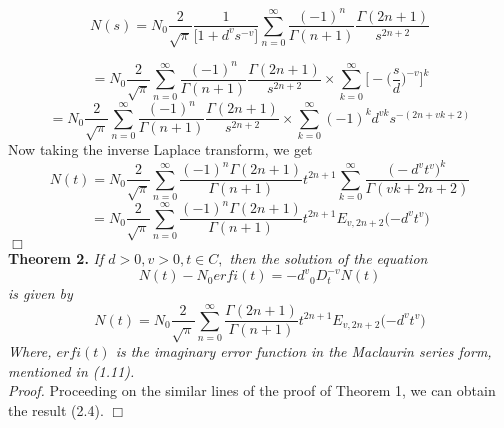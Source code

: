 \documentclass[leqno]{article}
\begin{document}
\begin{equation*}
    N(s) = N_0
    \frac{2}{\sqrt{\pi}}
    \frac{1}{\big[1+{d^v}{s^{-v}}\big]}
    \sum_{n = 0}^{\infty}
    \frac{(-1)^n}{\Gamma{(n+1)}}
    \frac{\Gamma{(2n+1)}}{s^{2n+2}}
\end{equation*}

\begin{equation*}
    =N_0
    \frac{2}{\sqrt{\pi}}\sum_{n = 0}^{\infty}
    \frac{(-1)^n}{\Gamma{(n+1)}}
    \frac{\Gamma{(2n+1)}}{s^{2n+2}}
    \times \sum_{k = 0}^{\infty}
    \Big[-\Big(\frac{s}{d}\Big)^{-v}\Big]^k
\end{equation*}
\begin{equation*}
    =N_0
    \frac{2}{\sqrt{\pi}}\sum_{n = 0}^{\infty}
    \frac{(-1)^n}{\Gamma{(n+1)}}
    \frac{\Gamma{(2n+1)}}{s^{2n+2}}
    \times \sum_{k = 0}^{\infty}
    (-1)^k d^{vk} s^{-(2n+vk+2)}
\end{equation*}
Now taking the inverse Laplace transform, we get
\begin{equation*}
    N(t)=N_0
    \frac{2}{\sqrt{\pi}}\sum_{n = 0}^{\infty}
    \frac{(-1)^n\Gamma{(2n+1)}}{\Gamma{(n+1)}}
    t^{2n+1}
    \sum_{k = 0}^{\infty}
    \frac{\Big(-d^v{t^v}\Big)^k}{\Gamma{(vk+2n+2)}}
\end{equation*}
\begin{equation*}
    =N_0
    \frac{2}{\sqrt{\pi}}
    \sum_{n = 0}^{\infty} 
    \frac{(-1)^n\Gamma{(2n+1)}}{\Gamma{(n+1)}}
    t^{2n+1}
    E_{v,{2n+2}}
    \Big({-d^v}{t^v}\Big)
\end{equation*}
\hfill$\Box$
\medskip
\noindent\\
{\bf Theorem 2.}
{\it 
If $d > 0, v > 0, t \in C,$ then the solution of the equation
\begin{equation}
    N(t) - N_0erfi(t) = {-d^v}{_0D_t^{-v}}N(t)
\end{equation}
is given by 
\begin{equation}
    N(t) = N_0
    \frac{2}{\sqrt{\pi}}
    \sum_{n = 0}^{\infty}
    \frac{\Gamma{(2n+1)}}{\Gamma{(n+1)}}
    t^{2n+1}
    E_{v,2n+2}
    \Big({-d^v}{t^v}\Big)
\end{equation}
Where, $erfi(t)$ is the imaginary error function in the Maclaurin series form, mentioned in (1.11). 
}
\vspace{0.05in}\\

\noindent
{\it Proof.} Proceeding on the similar lines of the proof of Theorem 1, we can obtain the result (2.4).
\hfill$\Box$
\medskip
\end{document}
